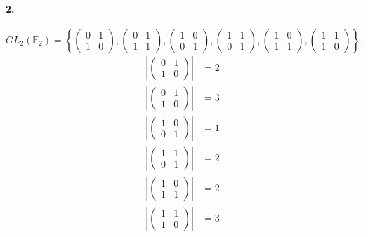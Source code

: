 \documentclass{article}
\begin{document}
\paragraph{2.} \[
  GL_2(\mathbb{F}_2) = \left\{
    \begin{pmatrix}
      0 & 1 \\
      1 & 0
    \end{pmatrix},
    \begin{pmatrix}
      0 & 1 \\
      1 & 1
    \end{pmatrix},
    \begin{pmatrix}
      1 & 0 \\
      0 & 1
    \end{pmatrix},
    \begin{pmatrix}
      1 & 1 \\
      0 & 1
    \end{pmatrix},
    \begin{pmatrix}
      1 & 0 \\
      1 & 1
    \end{pmatrix},
    \begin{pmatrix}
      1 & 1 \\
      1 & 0
    \end{pmatrix}
  \right\}.
\] \begin{align*}
  \left|\begin{pmatrix}
    0 & 1 \\
    1 & 0
  \end{pmatrix}\right| &= 2 \\
  \left|\begin{pmatrix}
    0 & 1 \\
    1 & 0
  \end{pmatrix}\right| &= 3 \\
  \left|\begin{pmatrix}
    1 & 0 \\
    0 & 1
  \end{pmatrix}\right| &= 1 \\
  \left|\begin{pmatrix}
    1 & 1 \\
    0 & 1
  \end{pmatrix}\right| &= 2 \\
  \left|\begin{pmatrix}
    1 & 0 \\
    1 & 1
  \end{pmatrix}\right| &= 2 \\
  \left|\begin{pmatrix}
    1 & 1 \\
    1 & 0
  \end{pmatrix}\right| &= 3
\end{align*}
\end{document}
